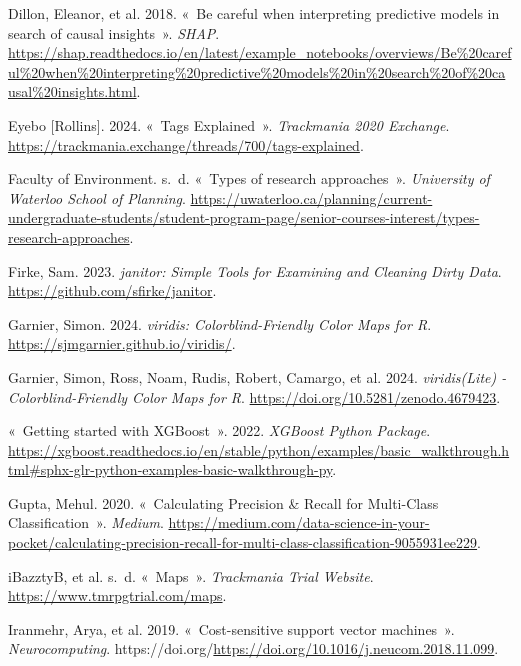 \documentclass[
  oneside,
  open=any]{scrreprt}
\newlength{\cslhangindent}
\newenvironment{CSLReferences}[2] %
 {\begin{list}{}{%
  \setlength{\itemindent}{0pt}
  \setlength{\leftmargin}{0pt}
  \setlength{\parsep}{0pt}
  \ifodd #1
   \setlength{\leftmargin}{\cslhangindent}
   \setlength{\itemindent}{-1\cslhangindent}
  \fi
  \setlength{\itemsep}{#2\baselineskip}}}
 {\end{list}}
\begin{document}
\begin{CSLReferences}{1}{0}
Dillon, Eleanor, et al. 2018. {«~Be careful when interpreting predictive
models in search of causal insights~»}. \emph{SHAP}.
\url{https://shap.readthedocs.io/en/latest/example_notebooks/overviews/Be\%20careful\%20when\%20interpreting\%20predictive\%20models\%20in\%20search\%20of\%20causal\%20insights.html}.

Eyebo {[}Rollins{]}. 2024. {«~Tags Explained~»}. \emph{Trackmania 2020
Exchange}. \url{https://trackmania.exchange/threads/700/tags-explained}.

Faculty of Environment. s.~d. {«~Types of research approaches~»}.
\emph{University of Waterloo School of Planning}.
\url{https://uwaterloo.ca/planning/current-undergraduate-students/student-program-page/senior-courses-interest/types-research-approaches}.

Firke, Sam. 2023. \emph{janitor: Simple Tools for Examining and Cleaning
Dirty Data}. \url{https://github.com/sfirke/janitor}.

Garnier, Simon. 2024. \emph{viridis: Colorblind-Friendly Color Maps for
R}. \url{https://sjmgarnier.github.io/viridis/}.

Garnier, Simon, Ross, Noam, Rudis, Robert, Camargo, et al. 2024.
\emph{{viridis(Lite)} - Colorblind-Friendly Color Maps for R}.
\url{https://doi.org/10.5281/zenodo.4679423}.

{«~Getting started with XGBoost~»}. 2022. \emph{XGBoost Python Package}.
\url{https://xgboost.readthedocs.io/en/stable/python/examples/basic_walkthrough.html\#sphx-glr-python-examples-basic-walkthrough-py}.

Gupta, Mehul. 2020. {«~Calculating Precision \& Recall for Multi-Class
Classification~»}. \emph{Medium}.
\url{https://medium.com/data-science-in-your-pocket/calculating-precision-recall-for-multi-class-classification-9055931ee229}.

iBazztyB, et al. s.~d. {«~Maps~»}. \emph{Trackmania Trial Website}.
\url{https://www.tmrpgtrial.com/maps}.

Iranmehr, Arya, et al. 2019. {«~Cost-sensitive support vector
machines~»}. \emph{Neurocomputing}.
https://doi.org/\url{https://doi.org/10.1016/j.neucom.2018.11.099}.


\end{CSLReferences}
\end{document}
